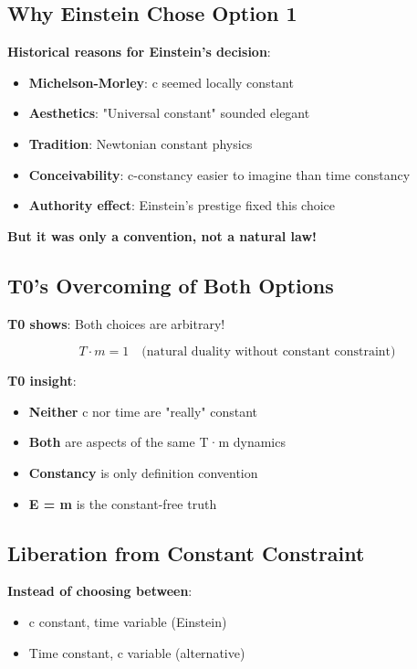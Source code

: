 \documentclass[12pt,a4paper]{article}
\newcommand{\Tfield}{T}
\begin{document}
	\subsection{Why Einstein Chose Option 1}
	
	\textbf{Historical reasons for Einstein's decision}:
	\begin{itemize}
		\item \textbf{Michelson-Morley}: c seemed locally constant
		\item \textbf{Aesthetics}: "Universal constant" sounded elegant
		\item \textbf{Tradition}: Newtonian constant physics
		\item \textbf{Conceivability}: c-constancy easier to imagine than time constancy
		\item \textbf{Authority effect}: Einstein's prestige fixed this choice
	\end{itemize}
	
	\textbf{But it was only a convention, not a natural law!}
	
	\subsection{T0's Overcoming of Both Options}
	
	\textbf{T0 shows}: Both choices are arbitrary!
	
	\begin{equation}
		\Tfield \cdot m = 1 \quad \text{(natural duality without constant constraint)}
	\end{equation}
	
	\textbf{T0 insight}:
	\begin{itemize}
		\item \textbf{Neither} c nor time are "really" constant
		\item \textbf{Both} are aspects of the same T·m dynamics
		\item \textbf{Constancy} is only definition convention
		\item \textbf{E = m} is the constant-free truth
	\end{itemize}
	
	\subsection{Liberation from Constant Constraint}
	
	\textbf{Instead of choosing between}:
	\begin{itemize}
		\item c constant, time variable (Einstein)
		\item Time constant, c variable (alternative)
	\end{itemize}
	
\end{document}

